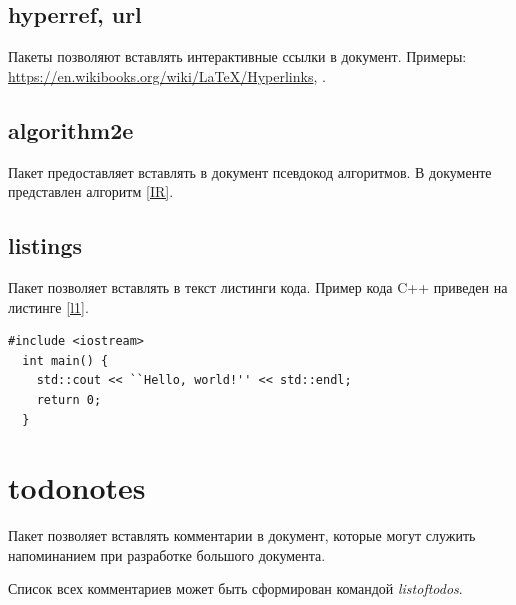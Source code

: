 \subsection{hyperref, url}
Пакеты позволяют вставлять интерактивные ссылки в документ.
Примеры: 
\url{https://en.wikibooks.org/wiki/LaTeX/Hyperlinks},
\hyperlink{contents}{\contentsname}.

\subsection{algorithm2e}
Пакет предоставляет вставлять в документ псевдокод алгоритмов.
В документе представлен алгоритм \ref{IR}.


\subsection{listings}
Пакет позволяет вставлять в текст листинги кода.
Пример кода C++ приведен на листинге \ref{l1}.

\begin{minipage}{\linewidth} %
\begin{lstlisting}[caption={Hello,world!},label=l1]
  #include <iostream>
  int main() {
    std::cout << ``Hello, world!'' << std::endl;
    return 0;
  }
\end{lstlisting}
\end{minipage}

\section{todonotes}
Пакет позволяет вставлять комментарии в документ, которые могут служить напоминанием при разработке большого документа.

Список всех комментариев может быть сформирован командой {\em listoftodos}.

\clearpage
\printbibliography

